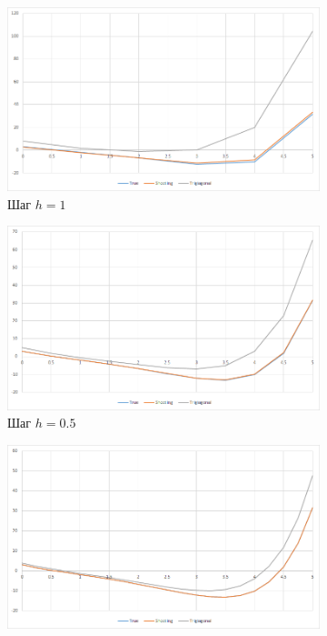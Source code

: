 \documentclass[11pt,a4paper,oneside]{article}
\begin{document}
\begin{figure}[h]
	\begin{subfigure}{0.5\textwidth}
		\centering
		\includegraphics[width=0.9\linewidth]{pics/plot1.png}
		\caption{Шаг $h=1$}
	\end{subfigure}
	\begin{subfigure}{0.5\textwidth}
		\centering
		\includegraphics[width=0.9\linewidth]{pics/plot2.png}
		\caption{Шаг $h=0.5$}
	\end{subfigure}
	\begin{subfigure}{0.5\textwidth}
		\centering
		\includegraphics[width=0.9\linewidth]{pics/plot3.png}

\end{subfigure}
\end{figure}
\end{document}

